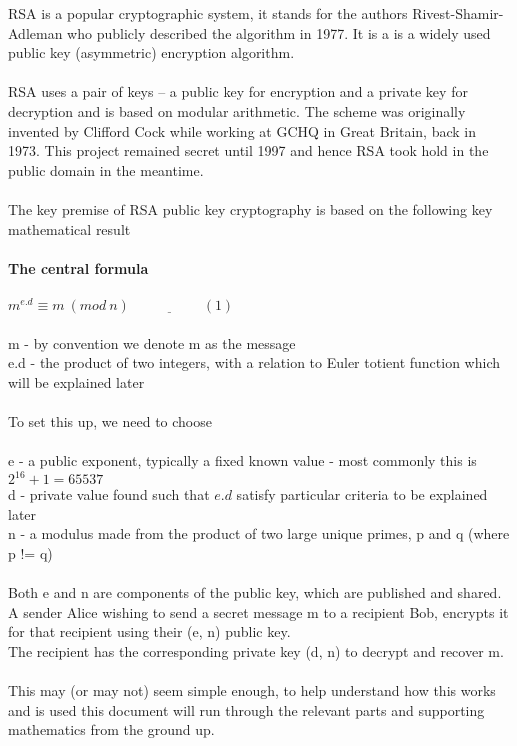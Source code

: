 \documentclass[11pt]{article}   	%
\begin{document}
RSA is a popular cryptographic system, it stands for the authors Rivest-Shamir-Adleman who publicly described the algorithm in 1977.
It is a is a widely used public key (asymmetric) encryption algorithm. \\
\\
RSA uses a pair of keys – a public key for encryption and a private key for decryption and is based on modular arithmetic.
The scheme was originally invented by Clifford Cock while working at GCHQ in Great Britain, back in 1973. This project remained secret until 1997 and hence RSA took hold in the public domain in the meantime. \\
\\
The key premise of RSA public key cryptography is based on the following key mathematical result \\
\\
\textbf{The central formula} \\
\\
$ m^{e.d} \equiv m \ (mod \ n)  \ \ \underline{\hspace{2cm}}(1) $\\
\\
m - by convention we denote m as the message \\
e.d - the product of two integers, with a relation to Euler totient function which will be explained later \\
\\
To set this up, we need to choose \\
\\
e - a public exponent, typically a fixed known value - most commonly this is $ 2^{16} + 1 = 65537 $ \\
d - private value found such that $ e.d $ satisfy particular criteria to be explained later \\
n - a modulus made from the product of two large unique primes, p and q (where p != q) \\
\\
Both e and n are components of the public key, which are published and shared. \\
A sender Alice wishing to send a secret message m to a recipient Bob, encrypts it for that recipient using their (e, n) public key. \\
The recipient has the corresponding private key (d, n) to decrypt and recover m. \\
\\
This may (or may not) seem simple enough, to help understand how this works and is used this document will run through the relevant parts and supporting mathematics from the ground up. \\
\end{document}
